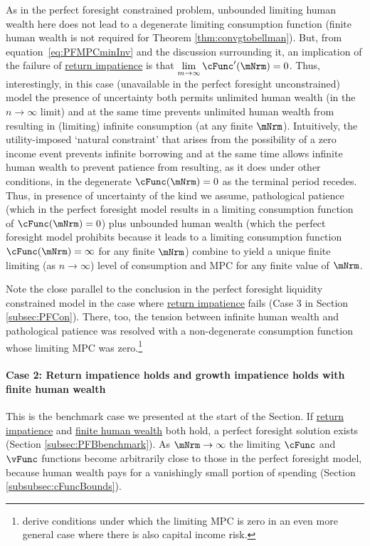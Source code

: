 \documentclass[\econtexRoot/BufferStockTheory]{subfiles}
\begin{document}
As in the perfect foresight constrained problem, unbounded limiting human wealth here does not lead to a degenerate limiting consumption function (finite human wealth is not required for Theorem \ref{thm:convgtobellman}).
But, from equation~\eqref{eq:PFMPCminInv} and the discussion surrounding it, an implication of the failure of \hyperlink{RIC}{return impatience} is that $\lim\limits_{m \rightarrow \infty} \usual{\cFunc}^{\prime}(\mNrm) = 0$.
Thus, interestingly, in this case (unavailable in the perfect foresight unconstrained) model the presence of uncertainty both permits unlimited human wealth (in the $n\rightarrow\infty$ limit) and at the same time prevents unlimited human wealth from resulting in (limiting) infinite consumption (at any finite $\mNrm$).
Intuitively, the utility-imposed `natural constraint' that arises from the possibility of a zero income event prevents infinite borrowing and at the same time allows infinite human wealth to prevent patience from resulting, as it does under other conditions, in the degenerate $\usual{\cFunc}(\mNrm)=0$ as the terminal period recedes.
Thus, in presence of uncertainty of the kind we assume, pathological patience (which in the perfect foresight model results in a limiting consumption function of $\usual{\cFunc}(\mNrm)=0$) plus unbounded human wealth (which the perfect foresight model prohibits because it leads to a limiting consumption function $\usual{\cFunc}(\mNrm)=\infty$ for any finite $\mNrm$) combine to yield a unique finite limiting (as $n \rightarrow \infty$) level of consumption and MPC for any finite value of $\mNrm$.


Note the close parallel to the conclusion in the perfect foresight liquidity constrained model in the case where \hyperlink{RIC}{return impatience} fails (Case 3 in Section \ref{subsec:PFCon}).
There, too, the tension between infinite human wealth and pathological patience was resolved with a non-degenerate consumption function whose limiting MPC was zero.\footnote{\cite{maTodaRich} derive conditions under which the limiting MPC is zero in an even more general case where there is also capital income risk.}

\hypertarget{When-the-RIC-Holds}{}
\paragraph{Case 2: Return impatience holds and growth impatience holds with finite human wealth} 
This is the benchmark case we presented at the start of the Section.
If \hyperlink{RIC}{return impatience}  and \hyperlink{FHWC}{finite human wealth} both hold, a perfect foresight solution exists (Section \ref{subsec:PFBbenchmark}).
As $\mNrm \rightarrow \infty$ the limiting $\cFunc$ and $\vFunc$ functions become arbitrarily close to those in the perfect foresight model, because human wealth pays for a vanishingly small portion of spending (Section \ref{subsubsec:cFuncBounds}).
\end{document}
